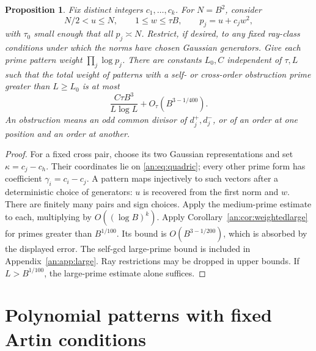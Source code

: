 \documentclass[11pt,reqno]{amsart}
\newtheorem{proposition}[theorem]{Proposition}
\theoremstyle{definition}
\numberwithin{equation}{section}
\begin{document}
\begin{proposition}\label{an:prop:fulltail}
Fix distinct integers $c_1,\ldots,c_k$. For $N=B^2$, consider
\[
 N/2<u\le N,\qquad 1\le w\le\tau B,
 \qquad p_j=u+c_jw^2,
\]
with $\tau_0$ small enough that all $p_j\asymp N$. Restrict, if desired, to any fixed ray-class conditions under which the norms have chosen Gaussian generators. Give each prime pattern weight $\prod_j\log p_j$. There are constants $L_0,C$ independent of $\tau,L$ such that the total weight of patterns with a self- or cross-order obstruction prime greater than $L\ge L_0$ is at most
\begin{equation}\label{an:eq:weightedtail}
 \frac{C\tau B^3}{L\log L}
       +O_\tau(B^{3-1/400}).
\end{equation}
An obstruction means an odd common divisor of $d_j^+,d_j^-$, or of an order at one position and an order at another.
\end{proposition}
\begin{proof}
For a fixed cross pair, choose its two Gaussian representations and set $\kappa=c_j-c_h$. Their coordinates lie on \eqref{an:eq:quadric}; every other prime form has coefficient $\gamma_i=c_i-c_j$. A pattern maps injectively to such vectors after a deterministic choice of generators: $u$ is recovered from the first norm and $w$. There are finitely many pairs and sign choices. Apply the medium-prime estimate to each, multiplying by $O((\log B)^k)$. Apply Corollary~\ref{an:cor:weightedlarge} for primes greater than $B^{1/100}$. Its bound is $O(B^{3-1/200})$, which is absorbed by the displayed error. The self-gcd large-prime bound is included in Appendix~\ref{an:app:large}. Ray restrictions may be dropped in upper bounds. If $L>B^{1/100}$, the large-prime estimate alone suffices.
\end{proof}

\section{Polynomial patterns with fixed Artin conditions}\label{an:sec:transfer}
\end{document}
